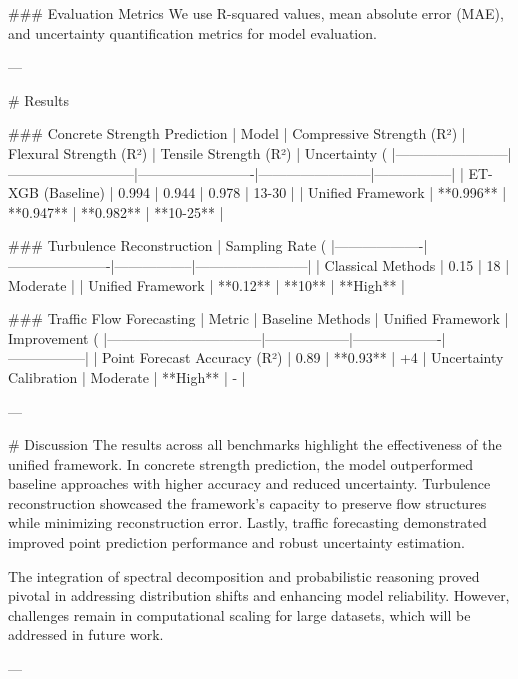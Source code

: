 ### Evaluation Metrics  
We use R-squared values, mean absolute error (MAE), and uncertainty quantification metrics for model evaluation.

---

# Results  

### Concrete Strength Prediction  
| Model                  | Compressive Strength (R²) | Flexural Strength (R²) | Tensile Strength (R²) | Uncertainty (%
|------------------------|---------------------------|-------------------------|------------------------|-----------------|
| ET-XGB (Baseline)      | 0.994                     | 0.944                   | 0.978                  | 13-30           |
| Unified Framework      | **0.996**                 | **0.947**               | **0.982**              | **10-25**       |

### Turbulence Reconstruction  
| Sampling Rate (%
|-------------------|----------------------|-----------------|------------------------|
| Classical Methods | 0.15                 | 18              | Moderate              |
| Unified Framework | **0.12**             | **10**          | **High**              |

### Traffic Flow Forecasting  
| Metric                          | Baseline Methods | Unified Framework | Improvement (%
|---------------------------------|------------------|-------------------|-----------------|
| Point Forecast Accuracy (R²)    | 0.89             | **0.93**          | +4%
| Uncertainty Calibration         | Moderate         | **High**          | -               |

---

# Discussion  
The results across all benchmarks highlight the effectiveness of the unified framework. In concrete strength prediction, the model outperformed baseline approaches with higher accuracy and reduced uncertainty. Turbulence reconstruction showcased the framework's capacity to preserve flow structures while minimizing reconstruction error. Lastly, traffic forecasting demonstrated improved point prediction performance and robust uncertainty estimation.

The integration of spectral decomposition and probabilistic reasoning proved pivotal in addressing distribution shifts and enhancing model reliability. However, challenges remain in computational scaling for large datasets, which will be addressed in future work.

---

